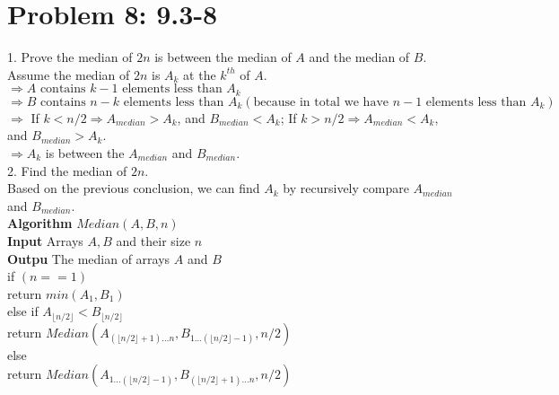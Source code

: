 \documentclass[a4paper]{article}
\begin{document}
\section{Problem 8: 9.3-8} 
1. Prove the median of $2n$ is between the median of $A$ and the median of $B$.\\
Assume the median of $2n$ is $A_k$ at the $k^{th}$ of $A$.\\
$\Rightarrow A \text{ contains } k-1 \text{ elements less than } A_k$\\
$\Rightarrow B \text{ contains } n-k \text{ elements less than } A_k (\text{because in total we have } n-1 \text{ elements less than } A_k)$\\
$\Rightarrow$ If $k<n/2\Rightarrow A_{median}>A_k$, and $B_{median}<A_k$; If $k>n/2\Rightarrow A_{median}<A_k$, and $B_{median}>A_k$.\\
$\Rightarrow A_k$ is between the $A_{median}$ and $B_{median}$.\\

2. Find the median of $2n$.\\
Based on the previous conclusion, we can find $A_k$ by recursively compare $A_{median}$ and $B_{median}$.\\
\textbf{Algorithm} $Median(A,B,n)$\\
\textbf{Input} Arrays $A, B$ and their size $n$\\
\textbf{Outpu} The median of arrays $A$ and $B$\\
\hspace*{1cm}if $(n==1)$\\
\hspace*{2cm}return $min(A_1, B_1)$\\
\hspace*{1cm}else if $A_{\lfloor{n/2}\rfloor} < B_{\lfloor{n/2}\rfloor}$\\
\hspace*{2cm}return $Median(A_{(\lfloor{n/2}\rfloor+1)\dots n}, B_{1\dots(\lfloor{n/2}\rfloor-1)}, n/2)$\\
\hspace*{1cm}else\\
\hspace*{2cm}return $Median(A_{1\dots(\lfloor{n/2}\rfloor-1)}, B_{(\lfloor{n/2}\rfloor+1)\dots n}, n/2)$\\
\end{document}
